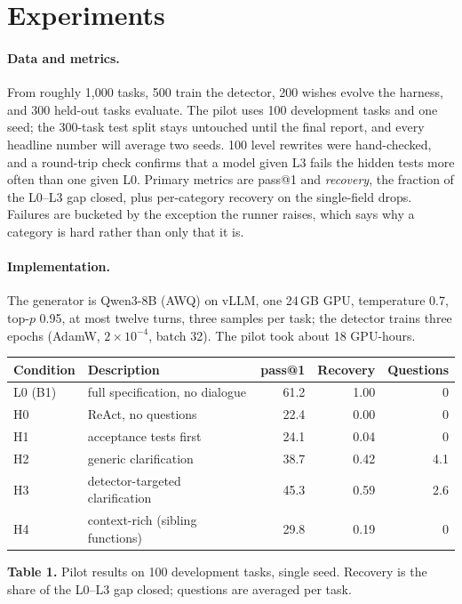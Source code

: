\documentclass{article}
\begin{document}
\section{Experiments}

\paragraph{Data and metrics.}
From roughly 1{,}000 tasks, 500 train the detector, 200 wishes evolve the harness, and 300
held-out tasks evaluate. The pilot uses 100 development tasks and one seed; the 300-task test
split stays untouched until the final report, and every headline number will average two seeds.
100 level rewrites were hand-checked, and a round-trip check confirms that a model given L3 fails
the hidden tests more often than one given L0. Primary metrics are pass@1 and
\emph{recovery}, the fraction of the L0--L3 gap closed, plus per-category recovery on the
single-field drops. Failures are bucketed by the exception the runner raises, which says why a
category is hard rather than only that it is.

\paragraph{Implementation.}
The generator is Qwen3-8B (AWQ) on vLLM, one 24\,GB GPU, temperature 0.7, top-$p$ 0.95, at most
twelve turns, three samples per task; the detector trains three epochs (AdamW,
$2\times10^{-4}$, batch 32). The pilot took
about 18 GPU-hours.

\begin{center}
  \small
  \begin{tabular}{@{}llrrr@{}}
    \toprule
    Condition & Description & pass@1 & Recovery & Questions \\
    \midrule
    L0 (B1) & full specification, no dialogue & 61.2 & 1.00 & 0 \\
    H0 & ReAct, no questions & 22.4 & 0.00 & 0 \\
    H1 & acceptance tests first & 24.1 & 0.04 & 0 \\
    H2 & generic clarification & 38.7 & 0.42 & 4.1 \\
    H3 & detector-targeted clarification & 45.3 & 0.59 & 2.6 \\
    H4 & context-rich (sibling functions) & 29.8 & 0.19 & 0 \\
    \bottomrule
  \end{tabular}
  \vspace{2pt}

  {\footnotesize\raggedright\textbf{Table 1.} Pilot results on 100 development tasks, single seed.
  Recovery is the share of the L0--L3 gap closed; questions are averaged per task.\par}
\end{center}
\end{document}
